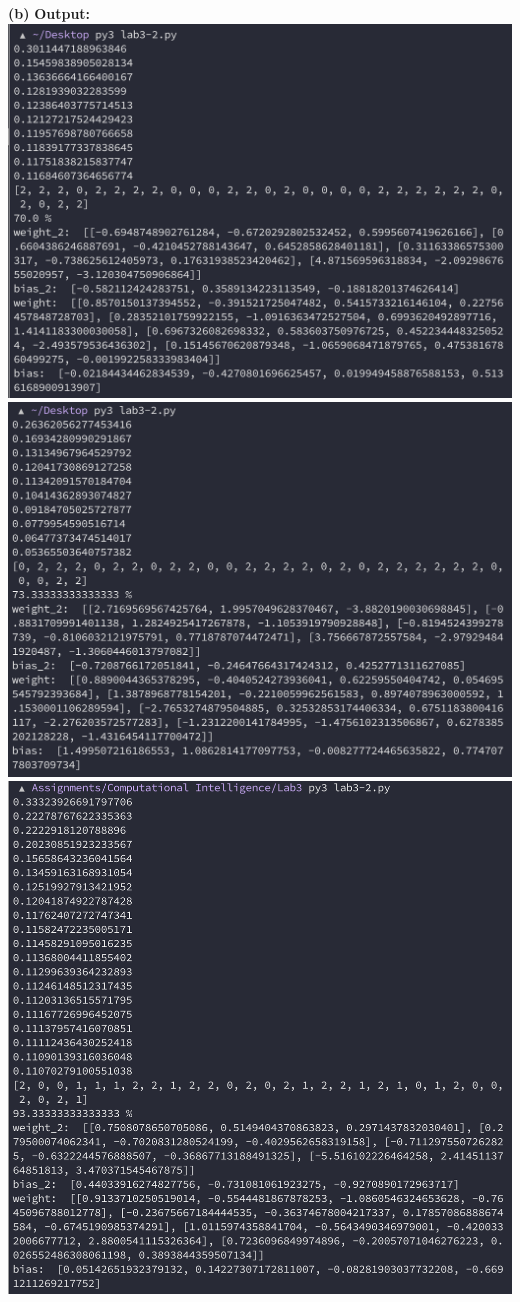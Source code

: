 \documentclass[11pt]{article}
\renewcommand\part[1]{\vspace{.10in}\textbf{(#1)}}
\newcommand\correctness{\vspace{.10in}\textbf{Output: }}
\begin{document}
\part{b} \correctness\\
\includegraphics[scale=0.65]{ot2.png}\\
\includegraphics[scale=0.65]{ot3.png}\\
\includegraphics[scale=0.65]{ot4.png}
\end{document}
